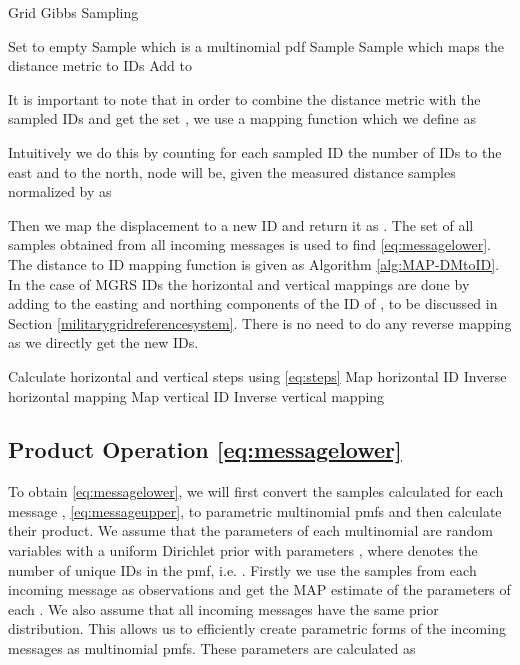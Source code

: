 \documentclass[10pt, final, journal]{IEEEtran}
\begin{document}
\begin{algorithm}
\caption{Grid Gibbs Sampling}
\begin{algorithmic}[1]
\label{alg:HSMgibbs}
\STATE Set  to empty
\FORALL{}
\STATE Sample  which is a multinomial pdf
\STATE Sample 
\STATE Sample 
\STATE  which maps the distance metric to IDs
\STATE Add  to 
\ENDFOR
\RETURN 
\end{algorithmic}
\end{algorithm}

It is important to note that in order to combine the distance metric with the sampled IDs  and get the set  , we use a mapping function which we define as

Intuitively we do this by counting for each sampled ID  the number of IDs to the east and to the north, node  will be, given the measured distance samples  normalized by  as

Then we map the displacement  to a new ID and return it as . The set  of all samples obtained from all incoming messages is used to find \eqref{eq:messagelower}. The distance to ID mapping function is given as Algorithm \ref{alg:MAP-DMtoID}. In the case of MGRS IDs the horizontal and vertical mappings are done by adding  to the easting and northing components of the ID of , to be discussed in Section \ref{militarygridreferencesystem}. There is no need to do any reverse mapping as we directly get the new IDs.

\begin{algorithm}
\caption{}
\begin{algorithmic}[1]
\label{alg:MAP-DMtoID}
\STATE Calculate horizontal and vertical steps using \eqref{eq:steps}
\STATE Map horizontal ID 
\STATE  
\STATE Inverse horizontal mapping 
\STATE Map vertical ID 
\STATE  
\STATE Inverse vertical mapping  
\RETURN 
\end{algorithmic}
\end{algorithm}

\subsection{Product Operation \eqref{eq:messagelower}}\label{productoperation}
To obtain \eqref{eq:messagelower}, we will first convert the samples calculated for each message  ,  \eqref{eq:messageupper}, to parametric multinomial pmfs and then calculate their product. We assume that the parameters of each multinomial are random variables   with a uniform Dirichlet prior with parameters , where  denotes the number of unique IDs in the pmf, i.e. .  Firstly we use the samples from each incoming message as observations and get the MAP estimate  of the parameters   of each . We also assume that all incoming messages have the same prior distribution. This allows us to efficiently create parametric forms of the incoming messages as multinomial pmfs. These parameters are calculated as
\end{document}
